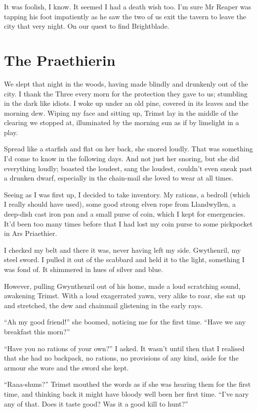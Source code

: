 \documentclass[12pt, a4paper]{book}
\begin{document}
It was foolish, I know. It seemed I had a death wish too. I'm sure Mr Reaper was tapping his foot impatiently as he saw the two of us exit the tavern to leave the city that very night. On our quest to find Brightblade.

\chapter{The Praethierin}
We slept that night in the woods, having made blindly and drunkenly out of the city. I thank the Three every morn for the protection they gave to us; stumbling in the dark like idiots. I woke up under an old pine, covered in its leaves and the morning dew. Wiping my face and sitting up, Trimst lay in the middle of the clearing we stopped at, illuminated by the morning sun as if by limelight in a play.

Spread like a starfish and flat on her back, she snored loudly. That was something I'd come to know in the following days. And not just her snoring, but she did everything loudly; boasted the loudest, sang the loudest, couldn't even sneak past a drunken dwarf, especially in the chain-mail she loved to wear at all times.

Seeing as I was first up, I decided to take inventory. My rations, a bedroll (which I really should have used), some good strong elven rope from Llandwyllen, a deep-dish cast iron pan and a small purse of coin, which I kept for emergencies. It'd been too many times before that I had lost my coin purse to some pickpocket in Ars Priaethier.

I checked my belt and there it was, never having left my side. Gwythenril, my steel sword. I pulled it out of the scabbard and held it to the light, something I was fond of. It shimmered in hues of silver and blue.

However, pulling Gwynthenril out of his home, made a loud scratching sound, awakening Trimst. With a loud exagerrated yawn, very alike to roar, she sat up and stretched, the dew and chainmail glistening in the early rays.

``Ah my good friend!'' she boomed, noticing me for the first time. ``Have we any breakfast this morn?''

``Have you no rations of your own?'' I asked. It wasn't until then that I realised that she had no backpack, no rations, no provisions of any kind, aside for the armour she wore and the sword she kept.

``Raaa-shuns?'' Trimst mouthed the words as if she was hearing them for the first time, and thinking back it might have bloody well been her first time. ``I've nary any of that. Does it taste good? Was it a good kill to hunt?''
\end{document}
